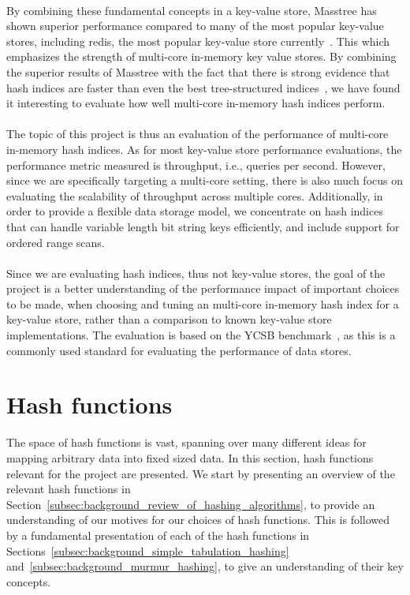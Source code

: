 \documentclass[11pt]{report} %
\begin{document}
\\
By combining these fundamental concepts in a key-value store, Masstree has shown superior performance compared to many of the most popular key-value stores, including redis, the most popular key-value store currently~\cite{db_ranking}. This which emphasizes the strength of multi-core in-memory key value stores. By combining the superior results of Masstree with the fact that there is strong evidence that hash indices are faster than even the best tree-structured indices~\cite{RAD15}, we have found it interesting to evaluate how well multi-core in-memory hash indices perform.\\
\\
The topic of this project is thus an evaluation of the performance of multi-core in-memory hash indices. As for most key-value store performance evaluations, the performance metric measured is throughput, i.e., queries per second. However, since we are specifically targeting a multi-core setting, there is also much focus on evaluating the scalability of throughput across multiple cores. Additionally, in order to provide a flexible data storage model, we concentrate on hash indices that can handle variable length bit string keys efficiently, and include support for ordered range scans.\\
\\
Since we are evaluating hash indices, thus not key-value stores, the goal of the project is a better understanding of the performance impact of important choices to be made, when choosing and tuning an multi-core in-memory hash index for a key-value store, rather than a comparison to known key-value store implementations. The evaluation is based on the YCSB benchmark~\cite{BC10}, as this is a commonly used standard for evaluating the performance of data stores.

\section{Hash functions}
\label{sec:background_hashing_algorithms}
The space of hash functions is vast, spanning over many different ideas for mapping arbitrary data into fixed sized data. In this section, hash functions relevant for the project are presented. We start by presenting an overview of the relevant hash functions in Section~\ref{subsec:background_review_of_hashing_algorithms}, to provide an understanding of our motives for our choices of hash functions. This is followed by a fundamental presentation of each of the hash functions in Sections~\ref{subsec:background_simple_tabulation_hashing} and~\ref{subsec:background_murmur_hashing}, to give an understanding of their key concepts.
\end{document}

